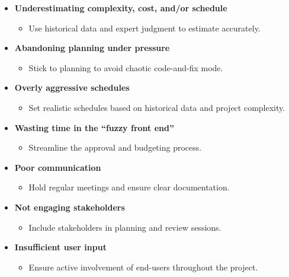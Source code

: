 \documentclass[10pt]{article}
\begin{document}
\ttfamily
\begin{multicols}{5}
  
\begin{block}
  \begin{itemize}
    \item \textbf{Underestimating complexity, cost, and/or schedule}
    \begin{itemize}
      \item Use historical data and expert judgment to estimate accurately.
    \end{itemize}
    \item \textbf{Abandoning planning under pressure}
    \begin{itemize}
      \item Stick to planning to avoid chaotic code-and-fix mode.
    \end{itemize}
    \item \textbf{Overly aggressive schedules}
    \begin{itemize}
      \item Set realistic schedules based on historical data and project complexity.
    \end{itemize}
    \item \textbf{Wasting time in the “fuzzy front end”}
    \begin{itemize}
      \item Streamline the approval and budgeting process.
    \end{itemize}
  \end{itemize}
  \end{block}
  
  \begin{block}
  \begin{itemize}
    \item \textbf{Poor communication}
    \begin{itemize}
      \item Hold regular meetings and ensure clear documentation.
    \end{itemize}
    \item \textbf{Not engaging stakeholders}
    \begin{itemize}
      \item Include stakeholders in planning and review sessions.
    \end{itemize}
    \item \textbf{Insufficient user input}
    \begin{itemize}
      \item Ensure active involvement of end-users throughout the project.
    \end{itemize}
  \end{itemize}
  \end{block}
  

\end{multicols}
\end{document}
